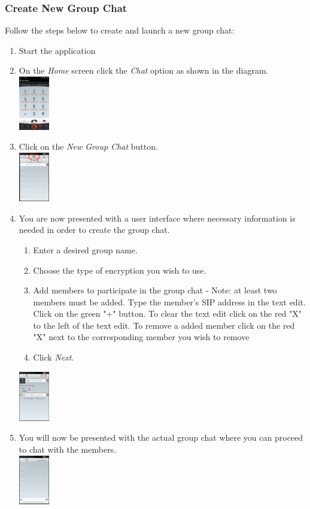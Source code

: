 \documentclass[11pt]{article}
\begin{document}
\subsubsection{Create New Group Chat} \label{create}
Follow the steps below to create and launch a new group chat:
\begin{enumerate}
\item Start the application
\item On the \textit{Home} screen click the \textit{Chat} option as shown in the diagram.\\
\includegraphics[width=50px]{images/mainScreen.png}
\item Click on the \textit{New Group Chat} button.\\
\includegraphics[width=50px]{images/ChatlistCG.png}
\item You are now presented with a user interface where necessary information is needed in order to create the group chat.
\begin{enumerate}
\item Enter a desired group name.
\item Choose the type of encryption you wish to use.
\item Add members to participate in the group chat - Note: at least two members must be added.
\subitem Type the member's SIP address in the text edit.
\subitem Click on the green "+" button.
\subitem To clear the text edit click on the red "X" to the left of the text edit.
\subitem To remove a added member click on the red "X" next to the corresponding member you wish to remove
\item Click \textit{Next}.
\end{enumerate}
\includegraphics[width=50px]{images/GroupChatCreation.png}
\item You will now be presented with the actual group chat where you can proceed to chat with the members.\\
\includegraphics[width=50px]{images/groupchat.png}
\end{enumerate}
\end{document}
